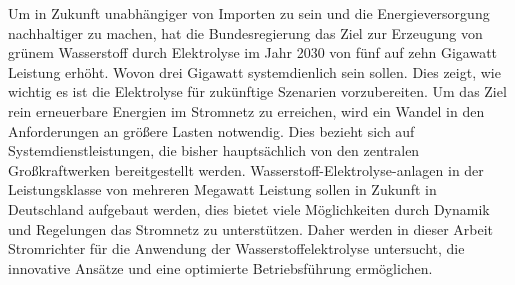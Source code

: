 Um in Zukunft unabhängiger von Importen zu sein und die Energieversorgung nachhaltiger zu machen, hat die Bundesregierung das Ziel zur Erzeugung von grünem Wasserstoff durch Elektrolyse im Jahr 2030 von fünf auf zehn Gigawatt Leistung erhöht. Wovon drei Gigawatt systemdienlich sein sollen. Dies zeigt, wie wichtig es ist die Elektrolyse für zukünftige Szenarien vorzubereiten.
Um das Ziel rein erneuerbare Energien im Stromnetz zu erreichen, wird ein Wandel in den Anforderungen an größere Lasten notwendig. Dies bezieht sich auf Systemdienstleistungen, die bisher hauptsächlich von den zentralen Großkraftwerken bereitgestellt werden. Wasserstoff-Elektrolyse-anlagen in der Leistungsklasse von mehreren Megawatt Leistung sollen in Zukunft in Deutschland aufgebaut werden, dies bietet viele Möglichkeiten durch Dynamik und Regelungen das Stromnetz zu unterstützen. Daher werden in dieser Arbeit Stromrichter für die Anwendung der Wasserstoffelektrolyse untersucht, die innovative Ansätze und eine optimierte Betriebsführung ermöglichen. 
